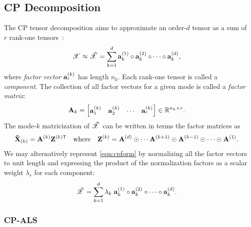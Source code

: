 \subsection{CP Decomposition}
The CP tensor decomposition aims to approximate an order-$d$ tensor as
a sum of $r$ rank-one
tensors~\cite{hitchcock-sum-1927, CANDECOMP, PARAFAC, Kolda:2009}:  
\begin{equation}
\label{eqn:cpform}
\T{X} \approx \T{\tilde{X}} = \sum_{k=1}^d \V{a}_k^{(1)} \circ \V{a}_k^{(2)} \circ \cdots \circ \V{a}_k^{(d)},
\end{equation}
where \emph{factor vector} $\V{a}_r^{(k)}$ has length $n_k$. 
Each rank-one tensor is called a \emph{component}.
The collection of all factor vectors for a given mode is called a 
\emph{factor matrix}:
\begin{displaymath}
  \Mn{A}{k} =
  \begin{bmatrix}
    \MnC{A}{k}{1} &
    \MnC{A}{k}{2} &
    \cdots &
    \MnC{A}{k}{r}
  \end{bmatrix}
  \in\R^{n_k \times r}.
\end{displaymath}
The mode-$k$ matricization of $\T{\tilde{X}}$ can be written in terms
the factor matrices as
\begin{equation}\label{eq:Zn}
  \M{\tilde{X}}_{(k)} = \M{A}^{(k)}\M{Z}^{(k)\trans}
  \qtext{where}
  \M{Z}^{(k)}=\M{A}^{(d)}\odot \cdots  \M{A}^{(k+1)}\odot
  \M{A}^{(k-1)} \odot \cdots \odot \M{A}^{(1)}.   
\end{equation}
We may alternatively represent \cref{eqn:cpform} by normalizing all
the factor vectors to unit length and expressing the product of the
normalization factors as a scalar weight $\lambda_r$ for each
component: 
\begin{equation}\label{eq:cpformlambda}
  \T{\tilde{X}} = \sum_{k=1}^d \lambda_k \; \V{a}_k^{(1)} \circ
  \V{a}_k^{(2)} \circ \cdots \circ \V{a}_k^{(d)}.
\end{equation}

\subsubsection{CP-ALS}

